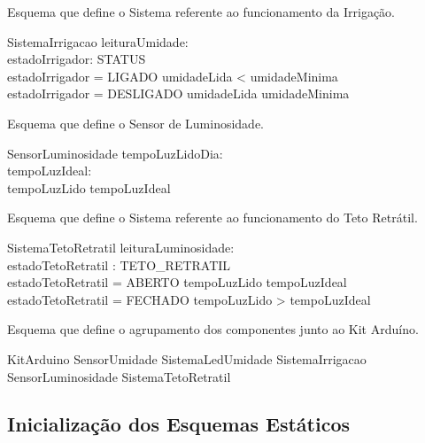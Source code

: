             Esquema que define o Sistema referente ao funcionamento da Irrigação.
            \begin{schema}{SistemaIrrigacao}
                leituraUmidade: \nat \\ 
                estadoIrrigador: STATUS\\
            \where
                estadoIrrigador = LIGADO \iff umidadeLida < umidadeMinima \\
                estadoIrrigador = DESLIGADO \iff umidadeLida \geq umidadeMinima \\
            \end{schema}

            \newpage
            Esquema que define o Sensor de Luminosidade.
            \begin{schema}{SensorLuminosidade}
                tempoLuzLidoDia: \nat \\
                tempoLuzIdeal: \nat \\               
            \where 
                 tempoLuzLido \leq tempoLuzIdeal \\
            \end{schema}

            Esquema que define o Sistema referente ao funcionamento do Teto Retrátil.
            \begin{schema}{SistemaTetoRetratil}
                leituraLuminosidade: \nat \\ 
                estadoTetoRetratil : TETO\_RETRATIL \\
            \where
                estadoTetoRetratil = ABERTO \iff tempoLuzLido \leq tempoLuzIdeal \\
                estadoTetoRetratil = FECHADO \iff tempoLuzLido > tempoLuzIdeal \\
            \end{schema}

            Esquema que define o agrupamento dos componentes junto ao Kit Arduíno.
            \begin{schema}{KitArduino}
                SensorUmidade \land
                SistemaLedUmidade \land 
                SistemaIrrigacao \land \\
                SensorLuminosidade \land 
                SistemaTetoRetratil \\
            \end{schema}

        \subsection{Inicialização dos Esquemas Estáticos}


